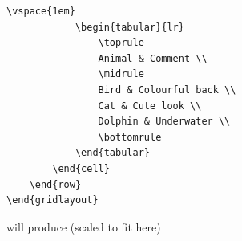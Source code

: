 \begin{example}
\begin{lstlisting}[style=custom-latex-example]
            \vspace{1em}
            \begin{tabular}{lr}
                \toprule
                Animal & Comment \\
                \midrule
                Bird & Colourful back \\
                Cat & Cute look \\
                Dolphin & Underwater \\
                \bottomrule
            \end{tabular}
        \end{cell}
    \end{row}
\end{gridlayout}
    \end{lstlisting}
    
    will produce (scaled to fit here)
    

\end{example}
